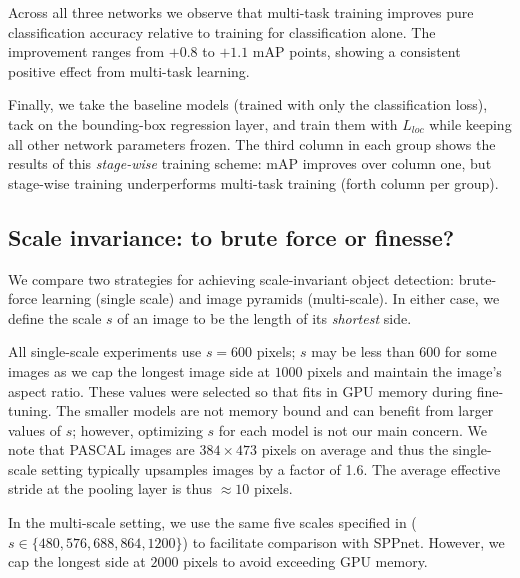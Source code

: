 Across all three networks we observe that multi-task training improves pure classification accuracy relative to training for classification alone.
The improvement ranges from $+0.8$ to $+1.1$ mAP points, showing a consistent positive effect from multi-task learning.

Finally, we take the baseline models (trained with only the classification loss), tack on the bounding-box regression layer, and train them with $L_{loc}$ while keeping all other network parameters frozen.
The third column in each group shows the results of this \emph{stage-wise} training scheme: mAP improves over column one, but stage-wise training underperforms multi-task training (forth column per group).

\subsection{Scale invariance: to brute force or finesse?}
We compare two strategies for achieving scale-invariant object detection: brute-force learning (single scale) and image pyramids (multi-scale).
In either case, we define the scale $s$ of an image to be the length of its \emph{shortest} side.

All single-scale experiments use $s = 600$ pixels;
$s$ may be less than $600$ for some images as we cap the longest image side at $1000$ pixels and maintain the image's aspect ratio.
These values were selected so that \vggsixteen fits in GPU memory during fine-tuning.
The smaller models are not memory bound and can benefit from larger values of $s$; however, optimizing $s$ for each model is not our main concern.
We note that PASCAL images are $384 \times 473$ pixels on average and thus the single-scale setting typically upsamples images by a factor of 1.6.
The average effective stride at the \roi pooling layer is thus $\approx 10$ pixels.

In the multi-scale setting, we use the same five scales specified in \cite{he2014spp} ($s \in \{480, 576, 688, 864, 1200\}$) to facilitate comparison with SPPnet.
However, we cap the longest side at $2000$ pixels to avoid exceeding GPU memory.

